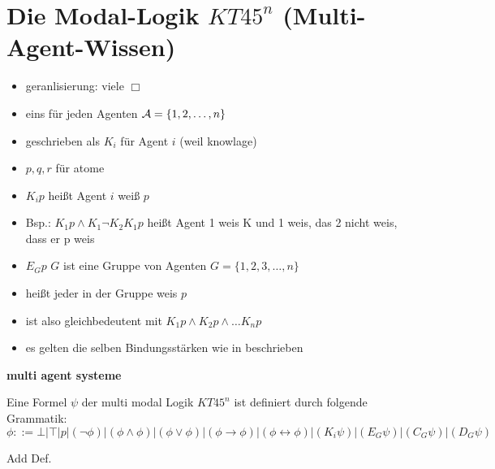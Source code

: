 
\section{Die Modal-Logik $KT45^n$ (Multi-Agent-Wissen)} %
\label{sub:the_modal_logic_kt45_n_}


\begin{itemize}
	\item geranlisierung: viele $\Box$
	\item eins für jeden Agenten $\mathcal{A} = \{1,2,\dots,n\}$ 
	\item geschrieben als $K_i$ für Agent $i$ (weil knowlage)
	\item $p,q,r$ für atome
	\item $K_ip$ heißt Agent $i$ weiß $p$
	\item Bsp.: $K_1p \wedge K_1 \neg K_2 K_1 p$ heißt Agent 1 weis K und 1 weis, das 2 nicht weis, dass er p weis
	\item $E_G p$ $G$ ist eine Gruppe von Agenten $G= \{1,2,3,\dots,n\}$
	\item heißt jeder in der Gruppe weis $p$
	\item ist also gleichbedeutent mit $K_1 p \wedge K_2 p \wedge \dots K_n p$
	\item es gelten die selben Bindungsstärken wie in  beschrieben
\end{itemize}



\textbf{multi agent systeme}
\begin{definition}
	\label{def:bnf_kt45n}
	Eine Formel $\psi$ der multi modal Logik $KT45^n$ ist definiert durch folgende Grammatik:
	\begin{equation}
		\label{eqn:bnf_kt45n}
		\phi ::= \bot|\top|p|(\neg\phi)|(\phi\wedge\phi)|(\phi\vee\phi)|(\phi\rightarrow\phi)|
		(\phi\leftrightarrow\phi)|(K_i\psi)|(E_G\psi)|(C_G\psi)|(D_G\psi)
	\end{equation}
\end{definition}
\cite[S.335f]{huth2004logic}

\begin{definition}
	Add Def.
\end{definition}
\cite[S.336f]{huth2004logic}

